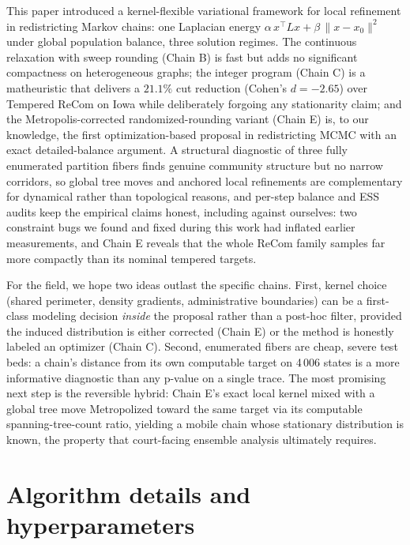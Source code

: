 \documentclass[11pt]{article}
\begin{document}
This paper introduced a kernel-flexible variational framework for
local refinement in redistricting Markov chains: one Laplacian energy
$\alpha\,x^\top L x + \beta\,\|x - x_0\|^2$ under global population
balance, three solution regimes. The continuous relaxation with sweep
rounding (Chain B) is fast but adds no significant compactness on
heterogeneous graphs; the integer program (Chain C) is a matheuristic
that delivers a $21.1\%$ cut reduction (Cohen's $d = -2.65$) over
Tempered ReCom on Iowa while deliberately forgoing any stationarity
claim; and the Metropolis-corrected randomized-rounding variant
(Chain E) is, to our knowledge, the first optimization-based proposal
in redistricting MCMC with an exact detailed-balance argument. A
structural diagnostic of three fully enumerated partition fibers
finds genuine community structure but no narrow corridors, so global
tree moves and anchored local refinements are complementary for
dynamical rather than topological reasons,
and per-step balance and ESS audits keep the empirical claims honest,
including against ourselves: two constraint bugs we found and fixed
during this work had inflated earlier measurements, and Chain E
reveals that the whole ReCom family samples far more compactly than
its nominal tempered targets.

For the field, we hope two ideas outlast the specific chains. First,
kernel choice (shared perimeter, density gradients, administrative
boundaries) can be a first-class modeling decision \emph{inside}
the proposal rather than a post-hoc filter, provided the induced
distribution is either corrected (Chain E) or the method is honestly
labeled an optimizer (Chain C). Second, enumerated fibers are cheap,
severe test beds: a chain's distance from its own computable target
on 4\,006 states is a more informative diagnostic than any p-value on
a single trace. The most promising next step is the reversible
hybrid: Chain E's exact local kernel mixed with a global tree move
Metropolized toward the same target via its computable
spanning-tree-count ratio, yielding a mobile chain whose stationary
distribution is known, the property that court-facing ensemble
analysis ultimately requires.

\appendix
\section{Algorithm details and hyperparameters}\label{app:hyperparams}
\end{document}
